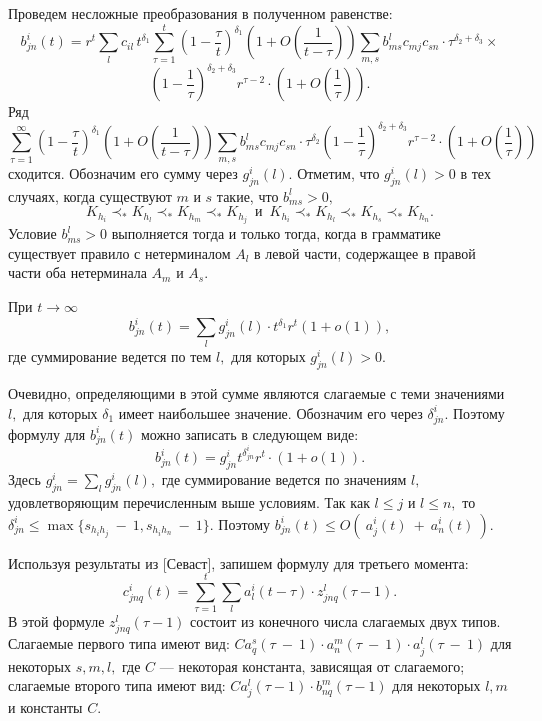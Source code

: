 \documentclass[12pt,russian]{article}
\begin{document}
{Проведем несложные преобразования в полученном равенстве:
$$
b^i_{jn}(t)= r^t 
\sum_{l}   c_{il}\,t^{\delta_1}
\sum_{\tau=1}^t\left(1-\frac{\tau}{t} \right)^{\delta_1} \left( 1+O \left(\frac{1}{t-\tau}\right)\right)
\sum_{m,s} b^l_{ms}c_{mj} c_{sn} \cdot \tau^{\delta_2+\delta_3} \times
$$
$$
\left(1-\frac{1}{\tau}\right)^{\delta_2+\delta_3} r^{\tau-2} \cdot \left( 1+O \left(\frac{1}{\tau} \right) \right).
$$
Ряд 
$$
\sum_{\tau=1}^{\infty}\left(1-\frac{\tau}{t} \right)^{\delta_1} \left( 1+O \left(\frac{1}{t-\tau}\right)\right)
\sum_{m,s} b^l_{ms}c_{mj} c_{sn} \cdot \tau^{\delta_2} 
\left(1-\frac{1}{\tau}\right)^{\delta_2+\delta_3}  r^{\tau-2}\cdot \left( 1+O \left(\frac{1}{\tau} \right) \right)
$$
сходится. Обозначим его сумму через $g^i_{jn}(l).$ 
Отметим, что $g^i_{jn}(l)>0$ в тех случаях, когда существуют $m$ и $s$ такие, что $b^l_{ms}>0,$ 
$$
K_{h_i}\prec_*K_{h_l}\prec_*K_{h_m}\prec_*K_{h_j} \, \, \, \mbox{и} \, \, \, K_{h_i}\prec_*K_{h_l}\prec_*K_{h_s}\prec_*K_{h_n}.
$$
Условие $b^l_{ms}>0$ выполняется тогда и только тогда, когда в грамматике существует правило с нетерминалом $A_l$ в левой части, содержащее в правой части оба нетерминала $A_m$ и $A_s.$
 
При $t\rightarrow \infty$ 
$$
b^i_{jn}(t)=\sum_{l} g^i_{jn}(l) \cdot t^{\delta_1} r^t (1+o(1)),
$$
где суммирование ведется по тем $l,$ для которых $g^i_{jn}(l)>0$.

Очевидно, определяющими в этой сумме являются слагаемые с теми значениями $l,$ для которых ${\delta_1}$ имеет наибольшее значение. Обозначим его через $\delta^i_{jn}.$ Поэтому формулу для $b^i_{jn}(t)$ можно записать в следующем виде:
$$
b^i_{jn}(t)= g^i_{jn} t^{\delta^i_{jn}} r^t  \cdot (1+o(1)).
$$
Здесь $g^i_{jn}=\sum_{l} g^i_{jn}(l),$ где суммирование ведется по значениям $l,$ удовлетворяющим перечисленным выше условиям. 
Так как $l\leq j$ и $l \le n,$ то $\delta^i_{jn} \leq \max \{s_{h_ih_j}~-~1,s_{h_ih_n}~-~1\}.$ Поэтому $b^i_{jn}(t) \le O\left(~ a^i_j(t)~+~a^i_n(t)~\right).$

Используя результаты из [Севаст], запишем формулу для третьего момента:
$$
c^i_{jnq}(t)=\sum_{\tau=1}^t \sum_l a^i_l(t-\tau)\cdot z^l_{jnq}(\tau-1).
$$
В этой формуле $z^l_{jnq}(\tau-1)$ состоит из конечного числа
слагаемых двух типов. Слагаемые первого типа имеют вид: $C
a^s_q(\tau~-~1) \cdot a^m_n(\tau~-~1) \cdot a^l_j(\tau~-~1) $ для некоторых
$s,m,l,$ где $C$ --- некоторая константа, зависящая от слагаемого;
слагаемые второго типа имеют вид: $C
a^l_j(\tau-1) \cdot b^m_{nq}(\tau-1)$ для некоторых $l,m$ и константы
$C.$

}
\end{document}
